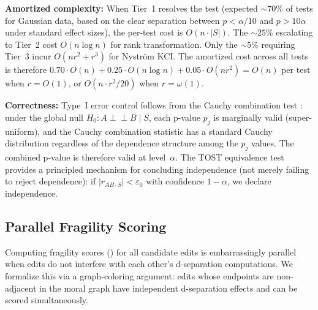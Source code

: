 \documentclass[11pt,a4paper]{article}
\theoremstyle{definition}
\theoremstyle{remark}
\newcommand{\CI}{\perp\!\!\!\perp}
\begin{document}
\noindent\textbf{Amortized complexity:} When Tier~1 resolves the test (expected
${\sim}70\%$ of tests for Gaussian data, based on the clear separation between
$p < \alpha/10$ and $p > 10\alpha$ under standard effect sizes), the per-test cost is
$O(n \cdot |S|)$. The ${\sim}25\%$ escalating to Tier~2 cost $O(n \log n)$ for rank
transformation. Only the ${\sim}5\%$ requiring Tier~3 incur $O(nr^2 + r^3)$ for
Nystr\"om KCI. The amortized cost across all tests is therefore
$0.70 \cdot O(n) + 0.25 \cdot O(n \log n) + 0.05 \cdot O(nr^2) = O(n)$ per test
when $r = O(1)$, or $O(n \cdot r^2 / 20)$ when $r = \omega(1)$.

\smallskip
\noindent\textbf{Correctness:} Type~I error control follows from the Cauchy combination
test \cite{liu2020}: under the global null $H_0: A \CI B \mid S$, each p-value $p_j$ is
marginally valid (super-uniform), and the Cauchy combination statistic has a standard
Cauchy distribution regardless of the dependence structure among the $p_j$ values. The
combined p-value is therefore valid at level~$\alpha$. The TOST equivalence test provides
a principled mechanism for concluding independence (not merely failing to reject
dependence): if $|r_{AB \cdot S}| < \varepsilon_0$ with confidence $1 - \alpha$, we
declare independence.


\subsection{Parallel Fragility Scoring}\label{sec:parallel_fragility}

Computing fragility scores () for all candidate edits is
embarrassingly parallel when edits do not interfere with each other's d-separation
computations. We formalize this via a graph-coloring argument: edits whose endpoints
are non-adjacent in the moral graph have independent d-separation effects and can be
scored simultaneously.
\end{document}
